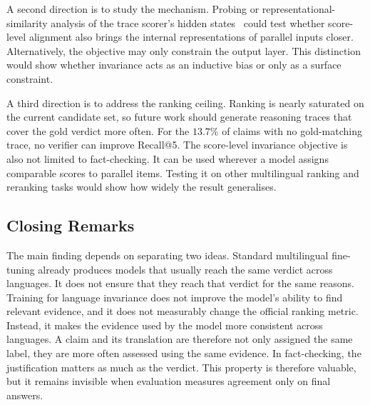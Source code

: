 A second direction is to study the mechanism. Probing or representational-similarity analysis of the
trace scorer's hidden states~\cite{wendler2024llamasworkenglishlatent,STOLLE2026100250} could test
whether score-level alignment also brings the internal representations of parallel inputs closer.
Alternatively, the objective may only constrain the output layer. This distinction would show whether
invariance acts as an inductive bias or only as a surface constraint.

A third direction is to address the ranking ceiling. Ranking is nearly saturated on the current
candidate set, so future work should generate reasoning traces that cover the gold verdict more often.
For the $13.7\%$ of claims with no gold-matching trace, no verifier can improve Recall@5. The
score-level invariance objective is also not limited to fact-checking. It can be used wherever a model
assigns comparable scores to parallel items. Testing it on other multilingual ranking and reranking
tasks would show how widely the result generalises.

\subsection{Closing Remarks}
\label{subsec:concl-closing}

The main finding depends on separating two ideas. Standard multilingual fine-tuning already produces
models that usually reach the same verdict across languages. It does not ensure that they reach that
verdict for the same reasons. Training for language invariance does not improve the model's ability to
find relevant evidence, and it does not measurably change the official ranking metric. Instead, it
makes the evidence used by the model more consistent across languages. A claim and its translation
are therefore not only assigned the same label, they are more often assessed using the same evidence.
In fact-checking, the justification matters as much as the verdict. This property is therefore
valuable, but it remains invisible when evaluation measures agreement only on final answers.
